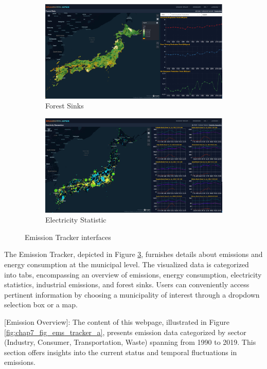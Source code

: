\begin{figure}[tbh!]
  \begin{subfigure}{.5\textwidth}
    \centering
    \includegraphics[width=.9\textwidth]{figs/chap7/ems_forest.png}
      \caption{Forest Sinks}
      \label{fig:chap7_fig_ems_tracker_d}
  \end{subfigure}%
  \begin{subfigure}{.5\textwidth}
      \centering
      \includegraphics[width=.9\textwidth]{figs/chap7/ems_electric.png}
      \caption{Electricity Statistic}
      \label{fig:chap7_fig_ems_tracker_e}
  \end{subfigure}
  \caption{Emission Tracker interfaces}
  \label{fig:chap7_fig_ems_tracker}
\end{figure}

The Emission Tracker, depicted in Figure \ref{fig:chap7_fig_ems_tracker}, furnishes details about emissions and energy consumption at the municipal level. The visualized data is categorized into tabs, encompassing an overview of emissions, energy consumption, electricity statistics, industrial emissions, and forest sinks. Users can conveniently access pertinent information by choosing a municipality of interest through a dropdown selection box or a map.\par

[Emission Overview]: The content of this webpage, illustrated in Figure \ref{fig:chap7_fig_ems_tracker_a}, presents emission data categorized by sector (Industry, Consumer, Transportation, Waste) spanning from 1990 to 2019. This section offers insights into the current status and temporal fluctuations in emissions.\par

